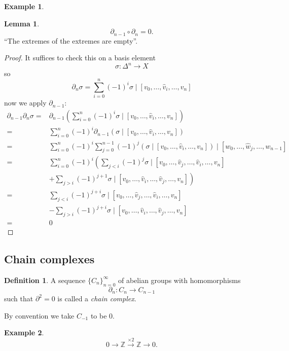 \documentclass[12pt]{article}
\theoremstyle{definition}
\newtheorem*{lem}{Lemma}
\theoremstyle{definition}
\newtheorem*{defn}{Definition}
\newtheorem*{ex}{Example}
\newcommand{\ZZ}{\mathbb{Z}}
\begin{document}
\begin{ex}
\end{ex}

\begin{lem}
\[\partial_{n-1} \circ \partial_n = 0.\]
``The extremes of the extremes are empty''.
\end{lem}
\begin{proof}
It suffices to check this on a basis element
\[\sigma \colon \Delta^n \to X\]
so
\[\partial_n \sigma = \sum_{i=0}^{n} (-1)^i \sigma \mid[v_0, \ldots, \hat{v}_i,\ldots,v_n]\]
now we apply $\partial_{n-1}$:
\begin{align*}
\partial_{n-1} \partial_n \sigma =& \partial_{n-1} \left(\sum_{i=0}^{n} (-1)^i \sigma \mid[v_0, \ldots, \hat{v}_i,\ldots,v_n] \right) \\
=& \sum_{i=0}^{n} (-1)^i \partial_{n-1} \left(\sigma \mid[v_0, \ldots, \hat{v}_i,\ldots,v_n]\right)\\
=& \sum_{i=0}^{n} (-1)^i \sum_{j= 0}^{n-1} (-1)^j\left(\sigma \mid[v_0, \ldots, \hat{v}_i,\ldots,v_n]\right)\mid[w_0, \ldots, \hat{w}_j,\ldots,w_{n-1}]\\
=& \sum_{i=0}^{n} (-1)^i\left( \sum_{j< i} (-1)^j \sigma \mid[v_0, \ldots,\hat{v}_j, \ldots, \hat{v}_i,\ldots,v_n] \right.\\
&+\left. \sum_{j> i} (-1)^{j+1} \sigma \mid[v_0, \ldots, \hat{v}_i,\ldots,\hat{v}_j,\ldots,v_n]\right) \\
=& \sum_{j< i} (-1)^{j+i} \sigma \mid[v_0, \ldots,\hat{v}_j, \ldots, \hat{v}_i,\ldots,v_n] \\
&- \sum_{j> i} (-1)^{j+i} \sigma \mid[v_0, \ldots, \hat{v}_i,\ldots,\hat{v}_j,\ldots,v_n] \\
=& 0
\end{align*}
\end{proof}

\subsection{Chain complexes}
\begin{defn}
A sequence $\{C_n\}_{n=0}^{\infty}$ of abelian groups with homomorphisms
\[
\partial_n\colon C_n\to C_{n-1}
\]
such that $\partial^2 = 0$ is called a \emph{chain complex}.
\end{defn}

By convention we take $C_{-1}$ to be 0.

\begin{ex}
\[0\to\ZZ\xrightarrow{\times 2} \ZZ \to 0.\]
\end{ex}
\end{document}

